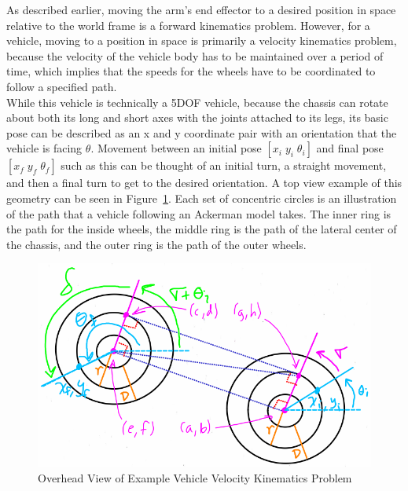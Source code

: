 As described earlier, moving the arm's end effector to a desired position in space relative to the world frame is a forward kinematics problem. However, for a vehicle, moving to a position in space is primarily a velocity kinematics problem, because the velocity of the vehicle body has to be maintained over a period of time, which implies that the speeds for the wheels have to be coordinated to follow a specified path. \\

While this vehicle is technically a \ac{5DOF} vehicle, because the chassis can rotate about both its long and short axes with the joints attached to its legs, its basic pose can be described as an x and y coordinate pair with an orientation that the vehicle is facing $\theta$. Movement between an initial pose $[x_{i} \; y_{i} \; \theta_{i}]$ and final pose $[x_{f} \; y_{f} \; \theta_{f}]$ such as this can be thought of an initial turn, a straight movement, and then a final turn to get to the desired orientation. A top view example of this geometry can be seen in Figure~\ref{sample_return_rover:vel_kin:top_view}. Each set of concentric circles is an illustration of the path that a vehicle following an Ackerman model takes. The inner ring is the path for the inside wheels, the middle ring is the path of the lateral center of the chassis, and the outer ring is the path of the outer wheels.

\begin{figure}[H]
	\centering
	\includegraphics[width=\textwidth]{sections/robot-design/images/vel_kin_top_view.png}
	\caption{Overhead View of Example Vehicle Velocity Kinematics Problem}
	\label{sample_return_rover:vel_kin:top_view}
\end{figure}

